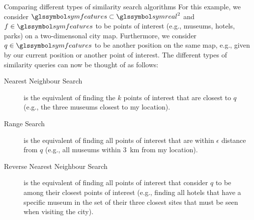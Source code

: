 \begin{example}[label=example:similarity_search]{Comparing different types of similarity search algorithms}{}
    For this example, we consider $\symfeatures \subset \symreal^2$ and $f \in \symfeatures$ to be points of interest (e.g., museums, hotels, parks) on a two-dimensonal city map. Furthermore, we consider $q \in \symfeatures$ to be another position on the same map, e.g., given by our current position or another point of interest. The different types of similarity queries can now be thought of as follows:

    \begin{description}
        \item[Nearest Neighbour Search] is the equivalent of finding the $k$ points of interest that are closest to $q$ (e.g., the three museums closest to my location).
        \item[Range Search] is the equivalent of finding all points of interest that are within $\epsilon$ distance from  $q$ (e.g., all museums within \SI{3}{km} from my location).
        \item[Reverse Nearest Neighbour Search] is the equivalent of finding all points of interest that consider $q$ to be among their closest points of interest (e.g., finding all hotels that have a specific museum in the set of their three closest sites that must be seen when visiting the city).
    \end{description}
\end{example}

